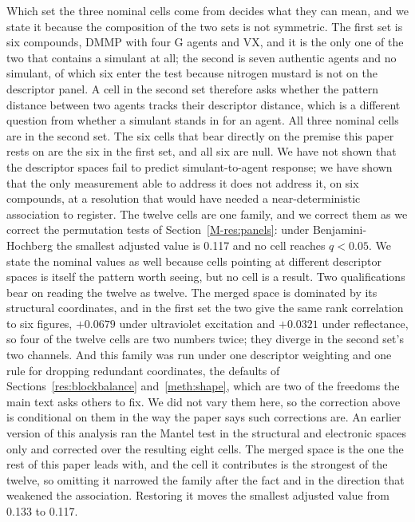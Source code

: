 \documentclass[11pt,a4paper]{article}
\begin{document}
Which set the three nominal cells come from decides what they can mean, and we
state it because the composition of the two sets is not symmetric. The first set is
six compounds, DMMP with four G agents and VX, and it is the only one of the two
that contains a simulant at all; the second is seven authentic agents and no
simulant, of which six enter the test because nitrogen mustard is not on the
descriptor panel. A cell in the second set therefore asks whether the pattern distance
between two agents tracks their descriptor distance, which is a different
question from whether a simulant stands in for an agent. All three nominal cells
are in the second set. The six cells that bear directly on the premise this
paper rests on are the six in the first set, and all six are null. We have not
shown that the descriptor spaces fail to predict simulant-to-agent response; we
have shown that the only measurement able to address it does not address it, on
six compounds, at a resolution that would have needed a near-deterministic
association to register. The twelve cells are one
family, and we correct them as we correct the permutation tests of
Section~\ref{M-res:panels}: under Benjamini-Hochberg the smallest adjusted value is
0.117 and no cell reaches $q<0.05$. We state the nominal values as well because
cells pointing at different descriptor spaces is itself the pattern worth
seeing, but no cell is a result. Two qualifications bear on reading the twelve
as twelve. The merged space is dominated by its structural coordinates, and in
the first set the two give the same rank correlation to six figures, $+0.0679$
under ultraviolet excitation and $+0.0321$ under reflectance, so four of the twelve
cells are two numbers twice; they diverge in the second set's two channels. And this family
was run under one descriptor weighting and one rule for dropping redundant
coordinates, the defaults of Sections~\ref{res:blockbalance}
and~\ref{meth:shape}, which are two of the freedoms the main text asks others
to fix. We did not vary them here, so the correction above is conditional on
them in the way the paper says such corrections are. An earlier version of this analysis ran the
Mantel test in the structural and electronic spaces only and corrected over the
resulting eight cells. The merged space is the one the rest of this paper leads
with, and the cell it contributes is the strongest of the twelve, so omitting it
narrowed the family after the fact and in the direction that weakened the
association. Restoring it moves the smallest adjusted value from 0.133 to
0.117.
\end{document}
